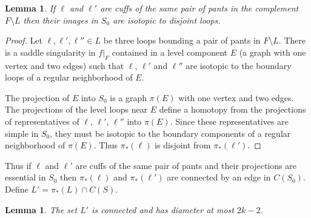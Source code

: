 \documentclass[12pt]{amsart}
\theoremstyle{plain}
\newtheorem{Lem}[Thm]{Lemma}
\theoremstyle{definition}
\begin{document}
\begin{Lem}
\label{pantsdsjtlem}
If $\ell$ and $\ell'$ are cuffs of the same pair of pants in the complement $F \setminus L$ then their images in $S_0$ are isotopic to disjoint loops.
\end{Lem}

\begin{proof}
Let $\ell, \ell', \ell'' \in L$ be three loops bounding a pair of pants in $F \setminus L$.  There is a saddle singularity in $f|_{F}$ contained in a level component $E$ (a graph with one vertex and two edges) such that $\ell$, $\ell'$ and $\ell''$ are isotopic to the boundary loops of a regular neighborhood of $E$.

The projection of $E$ into $S_0$ is a graph $\pi(E)$ with one vertex and two edges.  The projections of the level loops near $E$ define a homotopy from the projections of representatives of $\ell$, $\ell'$, $\ell''$ into $\pi(E)$.  Since these representatives are simple in $S_0$, they must be isotopic to the boundary components of a regular neighborhood of $\pi(E)$.  Thus $\pi_*(\ell)$ is disjoint from $\pi_*(\ell')$.
\end{proof}

Thus if $\ell$ and $\ell'$ are cuffs of the same pair of pants and their projections are essential in $S_0$ then $\pi_*(\ell)$ and $\pi_*(\ell')$ are connected by an edge in $C(S_0)$.  Define $L' = \pi_*(L) \cap C(S)$.

\begin{Lem}
\label{lconnectedlem}
The set $L'$ is connected and has diameter at most $2k - 2$.
\end{Lem}
\end{document}
